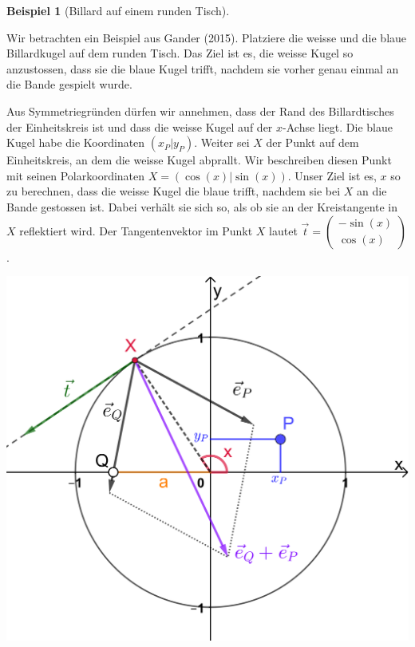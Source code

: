 \documentclass[
  letterpaper,
  DIV=11,
  oneside]{scrreprt}
\theoremstyle{definition}
\theoremstyle{definition}
\newtheorem{example}{Beispiel}[chapter]
\theoremstyle{remark}
\begin{document}
\leavevmode{}%
\begin{example}[Billard auf einem runden Tisch]\label{exm-Billard}

Wir betrachten ein Beispiel aus Gander (2015). Platziere die weisse und
die blaue Billardkugel auf dem runden Tisch. Das Ziel ist es, die weisse
Kugel so anzustossen, dass sie die blaue Kugel trifft, nachdem sie
vorher genau einmal an die Bande gespielt wurde.

Aus Symmetriegründen dürfen wir annehmen, dass der Rand des
Billardtisches der Einheitskreis ist und dass die weisse Kugel auf der
\(x\)-Achse liegt. Die blaue Kugel habe die Koordinaten \((x_P|y_P)\).
Weiter sei \(X\) der Punkt auf dem Einheitskreis, an dem die weisse
Kugel abprallt. Wir beschreiben diesen Punkt mit seinen Polarkoordinaten
\(X=(\cos(x)|\sin(x))\). Unser Ziel ist es, \(x\) so zu berechnen, dass
die weisse Kugel die blaue trifft, nachdem sie bei \(X\) an die Bande
gestossen ist. Dabei verhält sie sich so, als ob sie an der
Kreistangente in \(X\) reflektiert wird. Der Tangentenvektor im Punkt
\(X\) lautet
\(\vec{t} = \begin{pmatrix} -\sin(x) \\ \cos(x) \end{pmatrix}\).

\begin{marginfigure}

{\centering \includegraphics{./CircularBillard_sketch.png}

}
\end{marginfigure}
\end{example}
\end{document}
